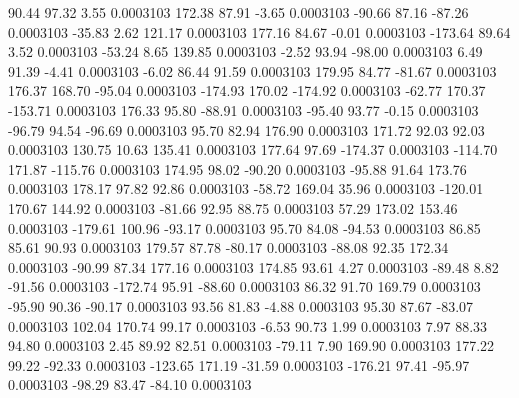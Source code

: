        90.44       97.32        3.55     0.0003103
      172.38       87.91       -3.65     0.0003103
      -90.66       87.16      -87.26     0.0003103
      -35.83        2.62      121.17     0.0003103
      177.16       84.67       -0.01     0.0003103
     -173.64       89.64        3.52     0.0003103
      -53.24        8.65      139.85     0.0003103
       -2.52       93.94      -98.00     0.0003103
        6.49       91.39       -4.41     0.0003103
       -6.02       86.44       91.59     0.0003103
      179.95       84.77      -81.67     0.0003103
      176.37      168.70      -95.04     0.0003103
     -174.93      170.02     -174.92     0.0003103
      -62.77      170.37     -153.71     0.0003103
      176.33       95.80      -88.91     0.0003103
      -95.40       93.77       -0.15     0.0003103
      -96.79       94.54      -96.69     0.0003103
       95.70       82.94      176.90     0.0003103
      171.72       92.03       92.03     0.0003103
      130.75       10.63      135.41     0.0003103
      177.64       97.69     -174.37     0.0003103
     -114.70      171.87     -115.76     0.0003103
      174.95       98.02      -90.20     0.0003103
      -95.88       91.64      173.76     0.0003103
      178.17       97.82       92.86     0.0003103
      -58.72      169.04       35.96     0.0003103
     -120.01      170.67      144.92     0.0003103
      -81.66       92.95       88.75     0.0003103
       57.29      173.02      153.46     0.0003103
     -179.61      100.96      -93.17     0.0003103
       95.70       84.08      -94.53     0.0003103
       86.85       85.61       90.93     0.0003103
      179.57       87.78      -80.17     0.0003103
      -88.08       92.35      172.34     0.0003103
      -90.99       87.34      177.16     0.0003103
      174.85       93.61        4.27     0.0003103
      -89.48        8.82      -91.56     0.0003103
     -172.74       95.91      -88.60     0.0003103
       86.32       91.70      169.79     0.0003103
      -95.90       90.36      -90.17     0.0003103
       93.56       81.83       -4.88     0.0003103
       95.30       87.67      -83.07     0.0003103
      102.04      170.74       99.17     0.0003103
       -6.53       90.73        1.99     0.0003103
        7.97       88.33       94.80     0.0003103
        2.45       89.92       82.51     0.0003103
      -79.11        7.90      169.90     0.0003103
      177.22       99.22      -92.33     0.0003103
     -123.65      171.19      -31.59     0.0003103
     -176.21       97.41      -95.97     0.0003103
      -98.29       83.47      -84.10     0.0003103
